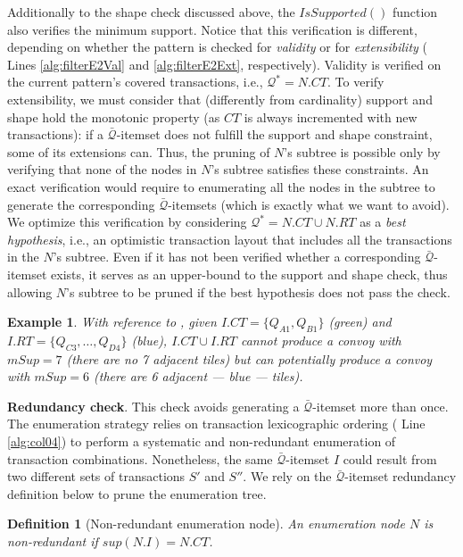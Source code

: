 \documentclass[
]{ceurart}
\newtheorem{example}{Example}
\newtheorem{definition}{Definition}
\begin{document}
Additionally to the shape check discussed above, the $IsSupported()$ function also verifies the minimum support.
Notice that this verification is different, depending on whether the pattern is checked for \textit{validity} or for \textit{extensibility} ( Lines \ref{alg:filterE2Val} and \ref{alg:filterE2Ext}, respectively).
Validity is verified on the current pattern's covered transactions, i.e., $\mathcal{Q}^* = N.CT$.
To verify extensibility, we must consider that (differently from cardinality) support and shape hold the monotonic property (as $CT$ is always incremented with new transactions): if a $\bar{\mathcal{Q}}$-itemset does not fulfill the support and shape constraint, some of its extensions can.
Thus, the pruning of $N$'s subtree is possible only by verifying that none of the nodes in $N$'s subtree satisfies these constraints.
An exact verification would require to enumerating all the nodes in the subtree to generate the corresponding $\bar{\mathcal{Q}}$-itemsets (which is exactly what we want to avoid).
We optimize this verification by considering $\mathcal{Q}^* = N.CT \cup N.RT$ as a \textit{best hypothesis}, i.e., an optimistic transaction layout that includes all the transactions in the $N$'s subtree.
Even if it has not been verified whether a corresponding $\bar{\mathcal{Q}}$-itemset exists, it serves as an upper-bound to the support and shape check, thus allowing $N$'s subtree to be pruned if the best hypothesis does not pass the check.

\begin{example}
With reference to , given $I.CT=\{Q_{A1},Q_{B1}\}$ (green) and $I.RT=\{Q_{C3},\ldots,Q_{D4}\}$ (blue), $I.CT \cup I.RT$ cannot produce a convoy with $mSup=7$ (there are no 7 adjacent tiles) but can potentially produce a convoy with $mSup=6$ (there are 6 adjacent --- blue --- tiles).
\end{example}

\textbf{Redundancy check}.
This check avoids generating a $\bar{\mathcal{Q}}$-itemset more than once.
The enumeration strategy relies on transaction lexicographic ordering ( Line \ref{alg:col04}) to perform a systematic and non-redundant enumeration of transaction combinations.
Nonetheless, the same $\bar{\mathcal{Q}}$-itemset $I$ could result from two different sets of transactions $S'$ and $S''$.
We rely on the $\bar{\mathcal{Q}}$-itemset redundancy definition below to prune the enumeration tree.

\begin{definition}[Non-redundant enumeration node]
An enumeration node $N$ is non-redundant if $sup(N.I) = N.CT$.
\end{definition}
\end{document}
